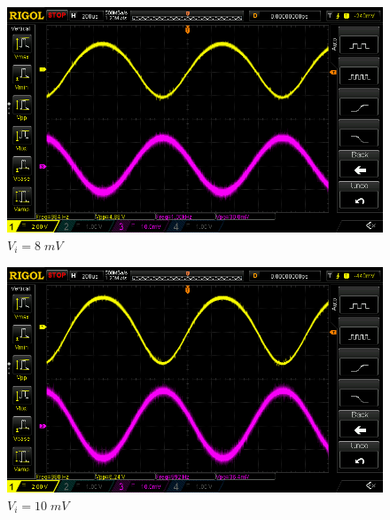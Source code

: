 \documentclass[uplatex,a4paper,11pt,oneside,openany]{jsbook}
\begin{document}
\begin{spacing}{0.71}
\begin{multicols}{2}
  \begin{figure}[H]
     \centering
      \includegraphics[keepaspectratio, scale=0.28, angle=0]
                  {rigol/figs/IOCharM1Y1_2kR/8mV.png}
                  \caption{$V_i=8\;mV$}
                  \label{fig:ioc8}
  \end{figure}

  \begin{figure}[H]
     \centering
      \includegraphics[keepaspectratio, scale=0.28, angle=0]
                {rigol/figs/IOCharM1Y1_2kR/10mV.png}
                \caption{$V_i=10\;mV$}
                \label{fig:ioc10}
  \end{figure}
\end{multicols}


\end{spacing}
\end{document}
